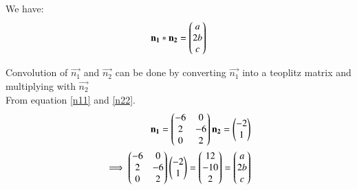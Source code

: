 \documentclass[journal,12pt,twocolumn]{IEEEtran}
\begin{document}
We have:
\begin{align}
\mathbf{n_1}\ast \mathbf{n_2} = \begin{pmatrix}a\\2b\\c\end{pmatrix} \label{eq:conv1}
\end{align}

Convolution of $\vec{n_1}$ and $\vec{n_2}$ can be done by converting  $\vec{n_1}$ into a teoplitz matrix and multiplying with $\vec{n_2}$\\
From equation \eqref{n11} and \eqref{n22}. 
\begin{align}
    \mathbf{n_1}=\begin{pmatrix}-6 & 0 \\ 2 & -6 \\ 0 & 2\end{pmatrix}
    \mathbf{n_2}=\begin{pmatrix}-2 \\ 1\end{pmatrix} \label{eq:conv2}\\
    \implies\begin{pmatrix}-6 & 0 \\ 2 & -6 \\ 0 & 2\end{pmatrix}\begin{pmatrix}-2 \\ 1\end{pmatrix} = \begin{pmatrix}12 \\ -10 \\ 2\end{pmatrix} = \begin{pmatrix}a\\2b\\c\end{pmatrix}\label{eq:conv3}
\end{align}
\end{document}
